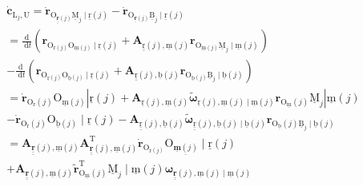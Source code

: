 \[
\begin{array}{l}
\dot{\boldsymbol{c}}_{\mathrm{L}_{j}, \mathrm{U}}=\dot{\boldsymbol{r}}_{\mathrm{O}_{\underline{\underline{\mathbf{r}}}(j)} \underline{\mathrm{M}}_{j} \mid \underline{\mathrm{r}}(j)}-\dot{\boldsymbol{r}}_{\mathrm{O}_{\underline{\mathbf{r}}(j)} \underline{\mathrm{B}}_{j} \mid \underline{\mathrm{r}}(j)} \\
=\frac{\mathrm{d}}{\mathrm{~d} t}\left(\boldsymbol{r}_{\mathrm{O}_{\mathrm{r}(j)} \mathrm{O}_{\underline{\mathrm{m}}(j)} \mid \underline{\mathrm{r}}(j)}+\boldsymbol{A}_{\underline{\underline{\mathrm{r}}}(j), \underline{\mathrm{m}}(j)} \boldsymbol{r}_{\mathrm{O}_{\underline{\mathrm{m}}(j)} \underline{\mathrm{M}}_{j} \mid \underline{\mathrm{m}}(j)}\right) \\
-\frac{\mathrm{d}}{\mathrm{~d} t}\left(\boldsymbol{r}_{\mathrm{O}_{\underline{\mathrm{r}}(j)} \mathrm{O}_{\underline{\mathrm{b}}(j)} \mid \underline{\mathrm{r}}(j)}+\boldsymbol{A}_{\underline{\underline{\mathrm{r}}}(j), \underline{\mathrm{b}}(j)} \boldsymbol{r}_{\mathrm{O}_{\underline{\mathrm{b}}(j)} \underline{\mathrm{B}}_{j} \mid \underline{\mathrm{b}}(j)}\right) \\
=\dot{\boldsymbol{r}}_{\mathrm{O}_{\mathrm{r}}(j)} \mathrm{O}_{\underline{\mathrm{m}}(j)}\left|\underline{\mathrm{r}}(j)+\boldsymbol{A}_{\underline{\mathrm{r}}(j), \underline{\mathrm{m}}(j)} \tilde{\boldsymbol{\omega}}_{\underline{\mathrm{r}}(j), \underline{\mathrm{m}}(j) \mid \underline{\mathrm{m}}(j)} \boldsymbol{r}_{\mathrm{O}_{\underline{\mathrm{m}}}(j)} \underline{\mathrm{M}}_{j}\right| \underline{\mathrm{m}}(j) \\
-\dot{\boldsymbol{r}}_{\mathrm{O}_{\mathrm{r}}(j)} \mathrm{O}_{\underline{\mathrm{b}}(j)} \mid \underline{\mathrm{r}}(j)-\boldsymbol{A}_{\underline{\underline{\mathrm{r}}}(j), \underline{\mathrm{b}}(j)} \tilde{\boldsymbol{\omega}}_{\underline{\underline{\mathrm{r}}}(j), \underline{\mathrm{b}}(j) \mid \underline{\mathrm{b}}(j)} \boldsymbol{r}_{\mathrm{O}_{\underline{\mathrm{b}}}(j) \underline{\mathrm{B}}_{j} \mid \underline{\mathrm{b}}(j)} \\
=\boldsymbol{A}_{\underline{\underline{\mathbf{r}}}(j), \underline{\mathrm{m}}(j)} \boldsymbol{A}_{\underline{\underline{\mathbf{r}}}(j), \underline{\mathrm{m}}(j)}^{\mathrm{T}} \dot{\boldsymbol{r}}_{\mathrm{O}_{\mathrm{r}(j)}} \mathrm{O}_{\underline{\underline{\mathbf{m}}(j)}} \mid \underline{\mathrm{r}}(j) \\
+\boldsymbol{A}_{\underline{\underline{\mathbf{r}}}(j), \underline{\mathrm{m}}(j)} \tilde{\boldsymbol{r}}_{\mathrm{O}_{\underline{\mathrm{m}}}(j)}^{\mathrm{T}} \underline{\mathrm{M}}_{j} \mid \underline{\mathrm{m}}(j) \boldsymbol{\omega}_{\underline{\underline{\mathbf{r}}}(j), \underline{\mathrm{m}}(j) \mid \underline{\mathrm{m}}(j)} \\

\end{array}\]
